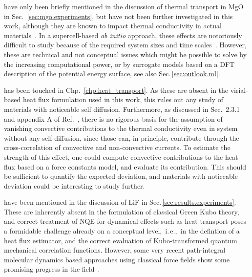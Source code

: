  have only been briefly mentioned in the discussion of thermal transport in MgO in Sec.~\ref{sec:mgo.experiments}, but have not been further investigated in this work, although they are known to impact thermal conductivity in actual materials~\cite{Bisson2000}. In a supercell-based \emph{ab initio} approach, these effects are notoriously difficult to study because of the required system sizes and time scales~\cite{Gibbons2011}. However, these are technical and not conceptual issues which might be possible to solve by the increasing computational power, or by surrogate models based on a DFT description of the potential energy surface, see also Sec.\,\ref{sec:outlook.ml}.

 has been touched in Chp.~\ref{chp:heat_transport}. As these are absent in the virial-based heat flux formulation used in this work, this rules out any study of materials with noticeable self diffusion. Furthermore, as discussed in Sec.~2.3.1 and appendix A of Ref.~\cite{ErcoleThesis}, there is no rigorous basis for the assumption of vanishing convective contributions to the thermal conductivity even in system without any self diffusion, since those can, in principle, contribute through the cross-correlation of convective and non-convective currents. To estimate the strength of this effect, one could compute convective contributions to the heat flux based on a force constants model, and evaluate its contribution. This should be sufficient to quantify the expected deviation, and materials with noticeable deviation could be interesting to study further.

 have been mentioned in the discussion of LiF in Sec.\,\ref{sec:results.experiments}. These are inherently absent in the formulation of classical Green Kubo theory, and correct treatment of NQE for dynamical effects such as heat transport poses a formidable challenge already on a conceptual level,~i.\,e.,~in the defintion of a heat flux estimator, and the correct evaluation of Kubo-transformed quantum mechanical correlation functions. However, some very recent path-integral molecular dynamics based approaches using classical force fields show some promising progress in the field~\cite{Luo2020,Sutherland2021}.

